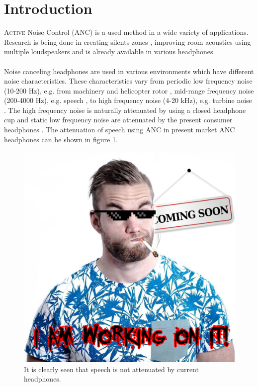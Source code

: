 \section*{Introduction}
\lettrine[lines=2]{A}{ctive} Noise Control (ANC) is a used method in a wide variety of applications. Research is being done in creating silents zones \cite{SilentZones}, improving room acoustics using multiple loudspeakers \cite{CAPS} and is already available in various headphones.
\\\\
Noise canceling headphones are used in various environments which have different noise characteristics. These characteristics vary from periodic low frequency noise (10-200 Hz), e.g. from machinery and helicopter rotor \cite{LowFrequency}, mid-range frequency noise (200-4000 Hz), e.g. speech \cite{MidFrequency}, to high frequency noise (4-20 kHz), e.g. turbine noise \cite{LowFrequency}. The high frequency noise is naturally attenuated by using a closed headphone cup \cite{naturalAttenuation} and static low frequency noise are attenuated by the present consumer headphones \cite{naturalAttenuation}. The attenuation of speech using ANC in present market ANC headphones can be shown in figure \ref{fig:ANCcompare}.

\begin{figure}[H]
	\centering
	\includegraphics[width=1\columnwidth]{figures/missingfigure}
	\caption{It is clearly seen that speech is not attenuated by current headphones.}
	\label{fig:ANCcompare}
\end{figure}


